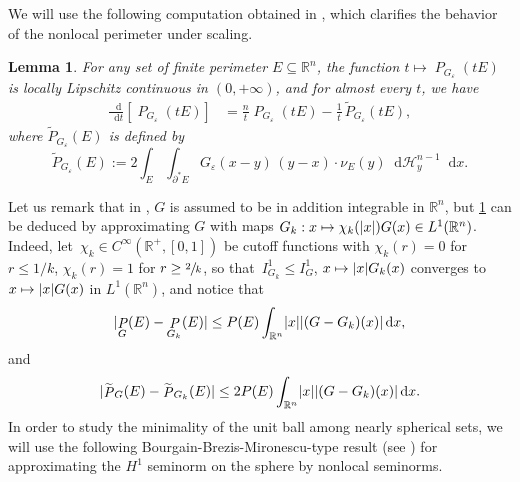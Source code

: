 \documentclass[JEP,XML,SOM,Unicode,published]{cedram}
\numberwithin{equation}{section}
\theoremstyle{plain}
\newtheorem{lem}[thm]{Lemma}
\theoremstyle{definition}
\newcommand{\numberset}[1]{{\mathbb{#1}}}
\newcommand{\R}{\numberset{R}}
\newcommand{\dd}{\mathop{}\mathopen{}\mathrm{d}}
\newcommand{\dx}{\mathop{}\mathopen{}\mathrm{d}x}
\newcommand{\dt}{\mathop{}\mathopen{}\mathrm{d}t}
\newcommand{\dH}{\mathop{}\mathopen{}\mathrm{d}\mathscr{H}}
\let\eps\varepsilon
\let\wt\widetilde
\newcommand{\Ren}{{\R^n}}
\newcommand{\subsq}{\subseteq}
\DeclareMathOperator{\Per}{\mathit{P}}
\DeclarePairedDelimiter{\abs}{\lvert}{\rvert}
\begin{document}
We will use the following computation obtained in \cite[Lem.\,3.5]{Peg2021}, which clarifies
the behavior of the nonlocal perimeter under scaling.

\begin{lem}\label{lem:derivpg}
For any set of finite perimeter $E\subsq\Ren$, the function $t\mapsto \Per_{G_\eps}(tE)$ is locally
Lipschitz continuous in $(0,+\infty)$, and for almost every $t$, we have
\[
\begin{aligned}
\frac{\dd}{\dt} \left[\Per_{G_\eps}(tE)\right]
&= \frac{n}{t}\Per_{G_\eps}(tE)-\frac{1}{t}\,\wt{P}_{G_\eps}(tE),
\end{aligned}
\]
where $\wt{P}_{G_\eps}(E)$ is defined by
\begin{equation}\label{defReps}
\wt{P}_{G_\eps}(E):= 2\int_E \int_{\partial^* E} G_\eps(x-y)\,(y-x)\cdot\nu_E(y)\dH^{n-1}_y\dx.
\end{equation}
\end{lem}

Let us remark that in \cite{Peg2021}, $G$ is assumed to be in addition integrable in $\Ren$, but
\cref{lem:derivpg} can be deduced by approximating $G$ with maps $G_k:x\mapsto
\chi_k(\abs{x})G(x) \in L^1(\Ren)$. Indeed, \mbox{let $\chi_k\in C^\infty(\R^+,[0,1])$} be cutoff
functions with $\chi_k(r)=0$ for \hbox{$r\leq 1/k$}, $\chi_k(r)=1$ for $r\geq \sfrac{2}{k}$, so
that~$I_{G_k}^1\leq I_G^1$, $x\mapsto \abs{x}G_k(x)$ converges to $x\mapsto \abs{x}G(x)$ in
$L^1(\Ren)$, and notice that
\[
\abs{\Per_G(E)-\Per_{G_k}(E)} \leq P(E)\int_{\Ren} \abs{x}\abs{(G-G_k)(x)}\dx,
\]
and
\[
\abs{\wt{\Per}_G(E)-\wt{\Per}_{G_k}(E)} \leq 2P(E)\int_{\Ren} \abs{x}\abs{(G-G_k)(x)}\dx.
\]
In order to study the minimality of the unit ball among nearly spherical sets, we will use the
following Bourgain-Brezis-Mironescu-type result (see \cite{BBM2001}) for approximating the $H^1$
seminorm on the sphere by nonlocal seminorms.
\end{document}
